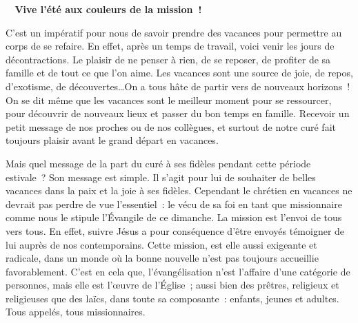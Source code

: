  \begin{center}
 \textbf{
\og 
Vive l’été aux couleurs de la mission !
 \fg{}
 }
 \end{center}

C’est un impératif pour nous de savoir prendre des vacances pour permettre au corps de se refaire. En effet, après un temps de travail, voici venir les jours de décontractions. Le plaisir de ne penser à rien, de se reposer, de profiter de sa famille et de tout ce que l’on aime. Les vacances sont une source de joie, de repos, d’exotisme, de découvertes…On a tous hâte de partir vers de nouveaux horizons ! On se dit même que les vacances sont le meilleur moment pour se ressourcer, pour découvrir de nouveaux lieux et passer du bon temps en famille. Recevoir un petit message de nos proches ou de nos collègues, et surtout de notre curé fait toujours plaisir avant le grand départ en vacances. 

Mais quel message de la part du curé à ses fidèles pendant cette période estivale ? Son message est simple. Il s’agit pour lui de souhaiter de belles vacances dans la paix et la joie à ses fidèles.
Cependant le chrétien en vacances ne devrait pas perdre de vue l’essentiel : le vécu de sa foi en tant que missionnaire comme nous le stipule l’Évangile de ce dimanche. La mission est l’envoi de tous vers tous. En effet, suivre Jésus a pour conséquence d’être envoyés témoigner de lui auprès de nos contemporains.
Cette mission, est elle aussi exigeante et radicale, dans un monde où la bonne nouvelle n’est pas toujours accueillie favorablement. C’est en cela que, l’évangélisation n’est l’affaire d’une catégorie de personnes, mais elle est l’œuvre de l’Église ; aussi bien des prêtres, religieux et religieuses que des laïcs, dans toute sa composante : enfants, jeunes et adultes.
Tous appelés, tous missionnaires.

